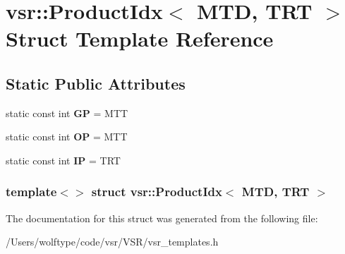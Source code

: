 \hypertarget{structvsr_1_1_product_idx_3_01_m_t_d_00_01_t_r_t_01_4}{\section{vsr\-:\-:Product\-Idx$<$ M\-T\-D, T\-R\-T $>$ Struct Template Reference}
\label{structvsr_1_1_product_idx_3_01_m_t_d_00_01_t_r_t_01_4}
}
\subsection*{Static Public Attributes}
\begin{DoxyCompactItemize}
\item 
\hypertarget{structvsr_1_1_product_idx_3_01_m_t_d_00_01_t_r_t_01_4_ae6f1d59a196fcd8949b76a9618b4e500}{static const int {\bfseries G\-P} = M\-T\-T}\label{structvsr_1_1_product_idx_3_01_m_t_d_00_01_t_r_t_01_4_ae6f1d59a196fcd8949b76a9618b4e500}

\item 
\hypertarget{structvsr_1_1_product_idx_3_01_m_t_d_00_01_t_r_t_01_4_a365891c26c87f67784f1f5ee20da17f6}{static const int {\bfseries O\-P} = M\-T\-T}\label{structvsr_1_1_product_idx_3_01_m_t_d_00_01_t_r_t_01_4_a365891c26c87f67784f1f5ee20da17f6}

\item 
\hypertarget{structvsr_1_1_product_idx_3_01_m_t_d_00_01_t_r_t_01_4_a87ecc6b35f176bef80b0678513ecd1ed}{static const int {\bfseries I\-P} = T\-R\-T}\label{structvsr_1_1_product_idx_3_01_m_t_d_00_01_t_r_t_01_4_a87ecc6b35f176bef80b0678513ecd1ed}

\end{DoxyCompactItemize}
\subsubsection*{template$<$$>$ struct vsr\-::\-Product\-Idx$<$ M\-T\-D, T\-R\-T $>$}



The documentation for this struct was generated from the following file\-:\begin{DoxyCompactItemize}
\item 
/\-Users/wolftype/code/vsr/\-V\-S\-R/vsr\-\_\-templates.\-h\end{DoxyCompactItemize}
